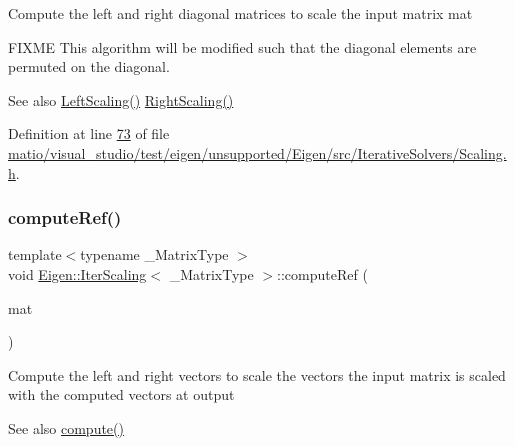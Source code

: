 Compute the left and right diagonal matrices to scale the input matrix {\ttfamily mat} 

F\+I\+X\+ME This algorithm will be modified such that the diagonal elements are permuted on the diagonal.

\begin{DoxySeeAlso}{See also}
\hyperlink{class_eigen_1_1_iter_scaling_ab88d288be912d90a1e597e5dab0bd47b}{Left\+Scaling()} \hyperlink{class_eigen_1_1_iter_scaling_a617229454935a6a4fda76b8af56c52ea}{Right\+Scaling()} 
\end{DoxySeeAlso}


Definition at line \hyperlink{matio_2visual__studio_2test_2eigen_2unsupported_2_eigen_2src_2_iterative_solvers_2_scaling_8h_source_l00073}{73} of file \hyperlink{matio_2visual__studio_2test_2eigen_2unsupported_2_eigen_2src_2_iterative_solvers_2_scaling_8h_source}{matio/visual\+\_\+studio/test/eigen/unsupported/\+Eigen/src/\+Iterative\+Solvers/\+Scaling.\+h}.

\mbox{\label{class_eigen_1_1_iter_scaling_aeff5ccef2ccb32c6f472a190f8a511af}} 
\subsubsection{\texorpdfstring{compute\+Ref()}{computeRef()}\hspace{0.1cm}{\footnotesize\ttfamily [1/2]}}
{\footnotesize\ttfamily template$<$typename \+\_\+\+Matrix\+Type $>$ \\
void \hyperlink{class_eigen_1_1_iter_scaling}{Eigen\+::\+Iter\+Scaling}$<$ \+\_\+\+Matrix\+Type $>$\+::compute\+Ref (\begin{DoxyParamCaption}\item[{Matrix\+Type \&}]{mat }\end{DoxyParamCaption})\hspace{0.3cm}{\ttfamily [inline]}}

Compute the left and right vectors to scale the vectors the input matrix is scaled with the computed vectors at output

\begin{DoxySeeAlso}{See also}
\hyperlink{class_eigen_1_1_iter_scaling_a6a76754399fd004b3ac6011e272ffb71}{compute()} 
\end{DoxySeeAlso}


